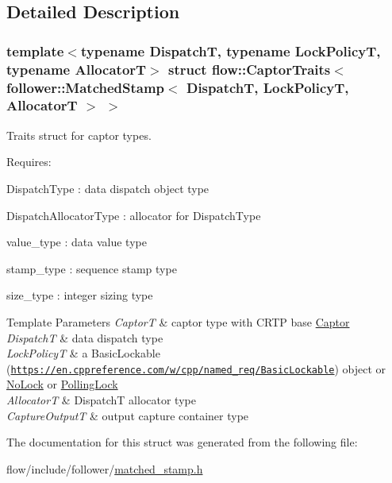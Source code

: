 \subsection{Detailed Description}
\subsubsection*{template$<$typename DispatchT, typename Lock\+PolicyT, typename AllocatorT$>$\newline
struct flow\+::\+Captor\+Traits$<$ follower\+::\+Matched\+Stamp$<$ Dispatch\+T, Lock\+Policy\+T, Allocator\+T $>$ $>$}

Traits struct for captor types. 

Requires\+:
\begin{DoxyItemize}
\item {\ttfamily Dispatch\+Type} \+: data dispatch object type
\item {\ttfamily Dispatch\+Allocator\+Type} \+: allocator for {\ttfamily Dispatch\+Type}
\item {\ttfamily value\+\_\+type} \+: data value type
\item {\ttfamily stamp\+\_\+type} \+: sequence stamp type
\item {\ttfamily size\+\_\+type} \+: integer sizing type
\end{DoxyItemize}


\begin{DoxyTemplParams}{Template Parameters}
{\em CaptorT} & captor type with C\+R\+TP base {\ttfamily \hyperlink{classflow_1_1_captor}{Captor}}\\
\hline
{\em DispatchT} & data dispatch type \\
\hline
{\em Lock\+PolicyT} & a Basic\+Lockable (\href{https://en.cppreference.com/w/cpp/named_req/BasicLockable}{\tt https\+://en.\+cppreference.\+com/w/cpp/named\+\_\+req/\+Basic\+Lockable}) object or \hyperlink{structflow_1_1_no_lock}{No\+Lock} or \hyperlink{structflow_1_1_polling_lock}{Polling\+Lock} \\
\hline
{\em AllocatorT} & {\ttfamily DispatchT} allocator type \\
\hline
{\em Capture\+OutputT} & output capture container type \\
\hline
\end{DoxyTemplParams}


The documentation for this struct was generated from the following file\+:\begin{DoxyCompactItemize}
\item 
flow/include/follower/\hyperlink{matched__stamp_8h}{matched\+\_\+stamp.\+h}\end{DoxyCompactItemize}
